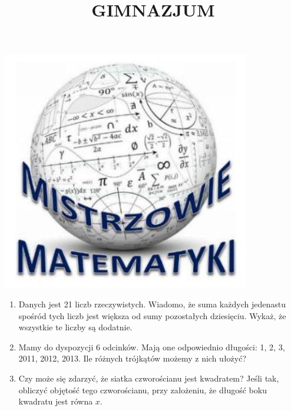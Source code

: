 \documentclass[10pt]{article}
\title{GIMNAZJUM }
\author{}
\date{}
\begin{document}
\maketitle
\begin{center}
\includegraphics[max width=\textwidth]{2024_11_21_fe664b95bb98a7256e95g-1}
\end{center}

\begin{enumerate}
  \item Danych jest 21 liczb rzeczywistych. Wiadomo, że suma każdych jedenastu spośród tych liczb jest większa od sumy pozostałych dziesięciu. Wykaż, że wszystkie te liczby są dodatnie.
  \item Mamy do dyspozycji 6 odcinków. Mają one odpowiednio długości: 1, 2, 3, 2011, 2012, 2013. Ile różnych trójkątów możemy z nich ułożyć?
  \item Czy może się zdarzyć, że siatka czworościanu jest kwadratem? Jeśli tak, obliczyć objętość tego czworościanu, przy założeniu, że długość boku kwadratu jest równa \(x\).
\end{enumerate}
\end{document}
